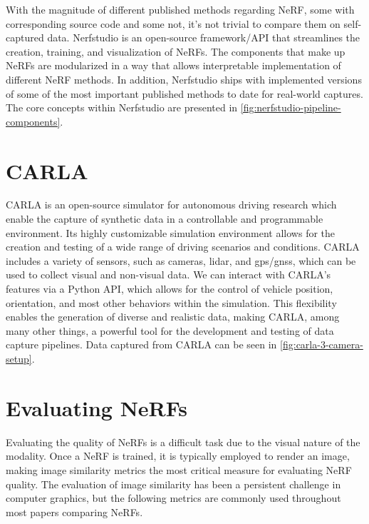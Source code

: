 With the magnitude of different published methods regarding NeRF, some with corresponding source code and some not, it's not trivial to compare them on self-captured data. Nerfstudio \cite{nerfstudio} is an open-source framework/API that streamlines the creation, training, and visualization of NeRFs. The components that make up NeRFs are modularized in a way that allows interpretable implementation of different NeRF methods. In addition, Nerfstudio ships with implemented versions of some of the most important published methods to date for real-world captures. The core concepts within Nerfstudio are presented in \autoref{fig:nerfstudio-pipeline-components}. 






\section{CARLA} \label{sec:carla}
CARLA \cite{Dosovitskiy17} is an open-source simulator for autonomous driving research which enable the capture of synthetic data in a controllable and programmable environment. Its highly customizable simulation environment allows for the creation and testing of a wide range of driving scenarios and conditions. CARLA includes a variety of sensors, such as cameras, \acrfull{lidar}, and \acrfull{gps}/\acrfull{gnss}, which can be used to collect visual and non-visual data. We can interact with CARLA’s features via a Python API, which allows for the control of vehicle position, orientation, and most other behaviors within the simulation. This flexibility enables the generation of diverse and realistic data, making CARLA, among many other things, a powerful tool for the development and testing of data capture pipelines. Data captured from CARLA can be seen in \autoref{fig:carla-3-camera-setup}.





\section{Evaluating NeRFs} \label{sec:evaluating-nerfs} 
Evaluating the quality of NeRFs is a difficult task due to the visual nature of the modality. Once a NeRF is trained, it is typically employed to render an image, making image similarity metrics the most critical measure for evaluating NeRF quality. The evaluation of image similarity has been a persistent challenge in computer graphics, but the following metrics are commonly used throughout most papers comparing NeRFs.

